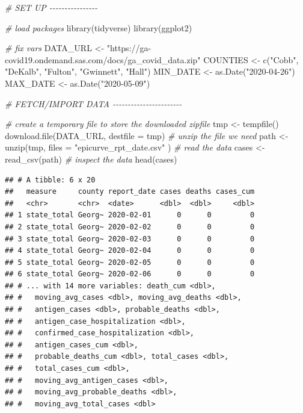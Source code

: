 \documentclass[
  12pt,
]{style/krantz}
\newenvironment{Shaded}{\begin{snugshade}}{\end{snugshade}}
\newcommand{\AttributeTok}[1]{\textcolor[rgb]{0.77,0.63,0.00}{#1}}
\newcommand{\CommentTok}[1]{\textcolor[rgb]{0.56,0.35,0.01}{\textit{#1}}}
\newcommand{\FunctionTok}[1]{\textcolor[rgb]{0.00,0.00,0.00}{#1}}
\newcommand{\NormalTok}[1]{#1}
\newcommand{\OtherTok}[1]{\textcolor[rgb]{0.56,0.35,0.01}{#1}}
\newcommand{\StringTok}[1]{\textcolor[rgb]{0.31,0.60,0.02}{#1}}
\begin{document}
\begin{Shaded}
\begin{Highlighting}[]
\CommentTok{\# SET UP {-}{-}{-}{-}{-}{-}{-}{-}{-}{-}{-}{-}{-}{-}{-}{-}}

\CommentTok{\# load packages}
\FunctionTok{library}\NormalTok{(tidyverse)}
\FunctionTok{library}\NormalTok{(ggplot2)}

\CommentTok{\# fix vars }
\NormalTok{DATA\_URL }\OtherTok{\textless{}{-}} \StringTok{"https://ga{-}covid19.ondemand.sas.com/docs/ga\_covid\_data.zip"}
\NormalTok{COUNTIES }\OtherTok{\textless{}{-}} \FunctionTok{c}\NormalTok{(}\StringTok{"Cobb"}\NormalTok{, }\StringTok{"DeKalb"}\NormalTok{, }\StringTok{"Fulton"}\NormalTok{, }\StringTok{"Gwinnett"}\NormalTok{, }\StringTok{"Hall"}\NormalTok{)}
\NormalTok{MIN\_DATE }\OtherTok{\textless{}{-}} \FunctionTok{as.Date}\NormalTok{(}\StringTok{"2020{-}04{-}26"}\NormalTok{)}
\NormalTok{MAX\_DATE }\OtherTok{\textless{}{-}} \FunctionTok{as.Date}\NormalTok{(}\StringTok{"2020{-}05{-}09"}\NormalTok{)}


\CommentTok{\# FETCH/IMPORT DATA {-}{-}{-}{-}{-}{-}{-}{-}{-}{-}{-}{-}{-}{-}{-}{-}{-}{-}{-}{-}{-}{-}{-}}

\CommentTok{\# create a temporary file to store the downloaded zipfile}
\NormalTok{tmp }\OtherTok{\textless{}{-}} \FunctionTok{tempfile}\NormalTok{()}
\FunctionTok{download.file}\NormalTok{(DATA\_URL, }\AttributeTok{destfile =}\NormalTok{ tmp)}
\CommentTok{\# unzip the file we need}
\NormalTok{path }\OtherTok{\textless{}{-}} \FunctionTok{unzip}\NormalTok{(tmp, }\AttributeTok{files =} \StringTok{"epicurve\_rpt\_date.csv"}\NormalTok{ )}
\CommentTok{\# read the data}
\NormalTok{cases }\OtherTok{\textless{}{-}} \FunctionTok{read\_csv}\NormalTok{(path)}
\CommentTok{\# inspect the data}
\FunctionTok{head}\NormalTok{(cases)}
\end{Highlighting}
\end{Shaded}

\begin{verbatim}
## # A tibble: 6 x 20
##   measure     county report_date cases deaths cases_cum
##   <chr>       <chr>  <date>      <dbl>  <dbl>     <dbl>
## 1 state_total Georg~ 2020-02-01      0      0         0
## 2 state_total Georg~ 2020-02-02      0      0         0
## 3 state_total Georg~ 2020-02-03      0      0         0
## 4 state_total Georg~ 2020-02-04      0      0         0
## 5 state_total Georg~ 2020-02-05      0      0         0
## 6 state_total Georg~ 2020-02-06      0      0         0
## # ... with 14 more variables: death_cum <dbl>,
## #   moving_avg_cases <dbl>, moving_avg_deaths <dbl>,
## #   antigen_cases <dbl>, probable_deaths <dbl>,
## #   antigen_case_hospitalization <dbl>,
## #   confirmed_case_hospitalization <dbl>,
## #   antigen_cases_cum <dbl>,
## #   probable_deaths_cum <dbl>, total_cases <dbl>,
## #   total_cases_cum <dbl>,
## #   moving_avg_antigen_cases <dbl>,
## #   moving_avg_probable_deaths <dbl>,
## #   moving_avg_total_cases <dbl>
\end{verbatim}
\end{document}
